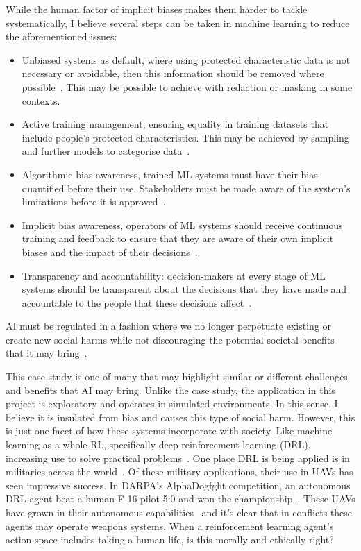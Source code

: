 \documentclass[]{final_report}
\begin{document}
While the human factor of implicit biases makes them harder to tackle systematically, I believe several steps can be taken in machine learning to reduce  the aforementioned issues:
\begin{itemize}
  \item Unbiased systems as default, where using protected characteristic data is not necessary or avoidable, then this information should be removed where possible~\cite{AIRisksAndPrinciples}. This may be possible to achieve with redaction or masking in some contexts.
  \item Active training management, ensuring equality in training datasets that include people's protected characteristics. This may be achieved by sampling and further models to categorise data~\cite{AIRisksAndPrinciples}.
  \item Algorithmic bias awareness, trained ML systems must have their bias quantified before their use. Stakeholders must be made aware of the system's limitations before it is approved~\cite{AIRisksAndPrinciples}.
  \item Implicit bias awareness, operators of ML systems should receive continuous training and feedback to ensure that they are aware of their own implicit biases and the impact of their decisions~\cite{facialRecognitionBias}.
  \item Transparency and accountability: decision-makers at every stage of ML systems should be transparent about the decisions that they have made and accountable to the people that these decisions affect~\cite{AIRisksAndPrinciples}.
\end{itemize}
AI must be regulated in a fashion where we no longer perpetuate existing or create new social harms while not discouraging the potential societal benefits that it may bring~\cite{AIRisksAndPrinciples}. 


This case study is one of many that may highlight similar or different challenges and benefits that AI may bring. Unlike the case study, the application in this project is exploratory and operates in simulated environments. In this sense, I believe it is insulated from bias and causes this type of social harm. However, this is just one facet of how these systems incorporate with society. Like machine learning as a whole RL, specifically deep reinforcement learning (DRL), increasing use to solve practical problems~\cite{deepRLsocietalImpact}. One place DRL is being applied is in militaries across the world~\cite{rlMilitaryReviewChina, DRLDrones}. Of these military applications, their use in UAVs has seen impressive success. In DARPA's AlphaDogfght competition, an autonomous DRL agent beat a human F-16 pilot 5:0 and won the championship~\cite{rlMilitaryReviewChina}. These UAVs have grown in their autonomous capabilities~\cite{DRLDrones} and it's clear that in conflicts these agents may operate weapons systems. When a reinforcement learning agent's action space includes taking a human life, is this morally and ethically right?
\end{document}
